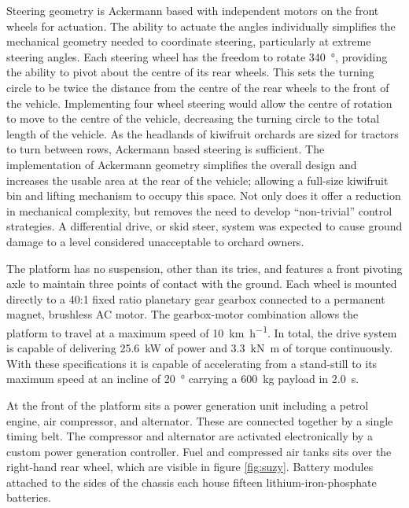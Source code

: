\documentclass[preprint,authoryear,12pt]{elsarticle}
\begin{document}
    Steering geometry is Ackermann based with independent motors on the front wheels for actuation.
    The ability to actuate the angles individually simplifies the mechanical geometry needed to coordinate steering, particularly at extreme steering angles.
    Each steering wheel has the freedom to rotate \SI{340}{\degree}, providing the ability to pivot about the centre of its rear wheels.
    This sets the turning circle to be twice the distance from the centre of the rear wheels to the front of the vehicle.
    Implementing four wheel steering would allow the centre of rotation to move to the centre of the vehicle, decreasing the turning circle to the total length of the vehicle.
    As the headlands of kiwifruit orchards are sized for tractors to turn between rows, Ackermann based steering is sufficient.
    The implementation of Ackermann geometry simplifies the overall design and increases the usable area at the rear of the vehicle; allowing a full-size kiwifruit bin and lifting mechanism to occupy this space.
    Not only does it offer a reduction in mechanical complexity, but removes the need to develop ``non-trivial'' control strategies.
    A differential drive, or skid steer, system was expected to cause ground damage to a level considered unacceptable to orchard owners.

    The platform has no suspension, other than its tries, and features a front pivoting axle to maintain three points of contact with the ground.
    Each wheel is mounted directly to a 40:1 fixed ratio planetary gear gearbox connected to a permanent magnet, brushless AC motor.
    The gearbox-motor combination allows the platform to travel at a maximum speed of \SI{10}{\kilo\meter\per\hour}.
    In total, the drive system is capable of delivering \SI{25.6}{\kilo\watt} of power and \SI{3.3}{\kilo\newton\meter} of torque continuously.
    With these specifications it is capable of accelerating from a stand-still to its maximum speed at an incline of \SI{20}{\degree} carrying a \SI{600}{\kilo\gram} payload in \SI{2.0}{\second}.

    At the front of the platform sits a power generation unit including a petrol engine, air compressor, and alternator.
    These are connected together by a single timing belt.
    The compressor and alternator are activated electronically by a custom power generation controller.
    Fuel and compressed air tanks sits over the right-hand rear wheel, which are visible in figure \ref{fig:suzy}.
    Battery modules attached to the sides of the chassis each house fifteen lithium-iron-phosphate batteries.
\end{document}
